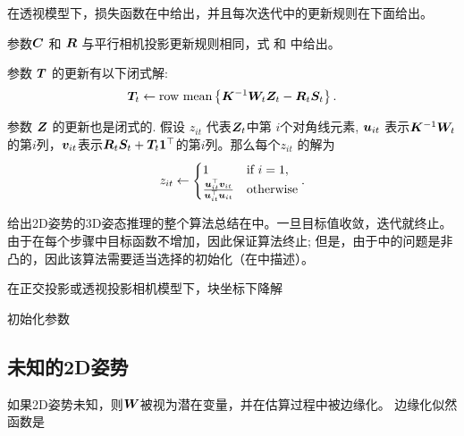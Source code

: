 在透视模型下，损失函数在中给出，并且每次迭代中的更新规则在下面给出。

参数${\bm{C}}$ 和 ${\bm{R}}$ 与平行相机投影更新规则相同，式 和 中给出。

参数 ${\bm{T}}$ 的更新有以下闭式解:
\begin{align}\label{eq:T-step-fp}
{\bm{T}}_t \leftarrow \mbox{row mean}\left\{{\bm{K}}^{-1}{\bm{W}}_t{\bm{Z}}_t - {\bm{R}}_t{\bm{S}}_t\right\}.
\end{align}

参数 ${\bm{Z}}$ 的更新也是闭式的. 假设 $z_{it}$ 代表${\bm{Z}}_t$中第 $i$个对角线元素, ${\bm{u}}_{it}$ 表示${\bm{K}}^{-1}{\bm{W}}_t$的第$i$列，${\bm{v}}_{it}$表示${\bm{R}}_t{\bm{S}}_t+{\bm{T}}_t{\bm{1}}^\top$的第$i$列。那么每个$z_{it}$ 的解为 
\begin{align}\label{eq:Z-step}
z_{it}\leftarrow 
\begin{cases}
     1 & \mbox{if $i=1$}, \\
    \frac{{\bm{u}}_{it}^\top{\bm{v}}_{it}}{{\bm{u}}_{it}^\top{\bm{u}}_{it}} & \mbox{otherwise}
\end{cases}.
\end{align}

给出2D姿势的3D姿态推理的整个算法总结在中。一旦目标值收敛，迭代就终止。由于在每个步骤中目标函数不增加，因此保证算法终止; 但是，由于中的问题是非凸的，因此该算法需要适当选择的初始化（在中描述）。

\begin{algorithm}[t]
\LinesNumbered
\caption{在正交投影或透视投影相机模型下，块坐标下降解}\label{alg:bcd}
\vspace{0.3em}
\vspace{0.3em}
初始化参数 
\end{algorithm}

\subsection{未知的2D姿势}\label{sec:unknown}

如果2D姿势未知，则${\bm{W}}$被视为潜在变量，并在估算过程中被边缘化。 边缘化似然函数是

